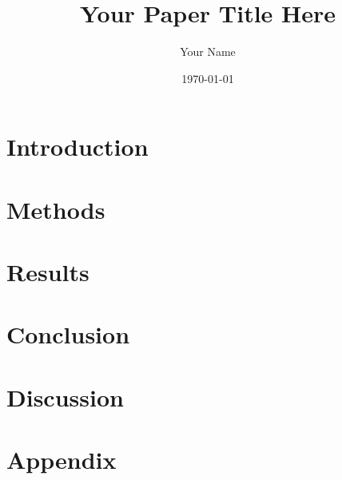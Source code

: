 \documentclass[12pt,a4paper]{article}
\title{Your Paper Title Here}
\author{Your Name}
\date{\today}
\begin{document}
\maketitle
\thispagestyle{empty}

\begin{abstract}

\end{abstract}

\newpage
\setcounter{page}{1}

\section{Introduction}


\section{Methods}


\section{Results}


\section{Conclusion}


\section{Discussion}


\newpage
\printbibliography[title=References]

\newpage
\appendix
\section{Appendix}

\end{document}

